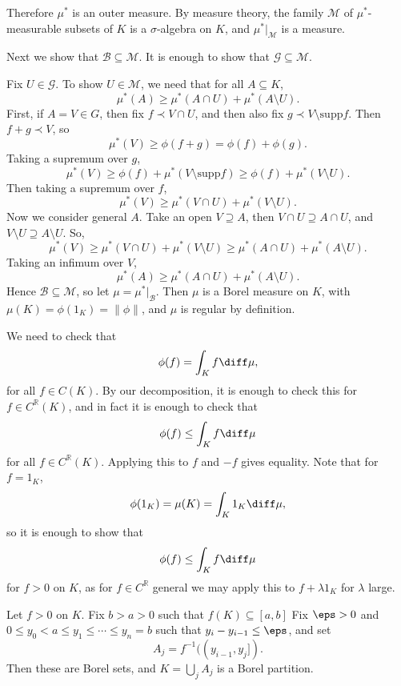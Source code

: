\documentclass[12pt]{article}
\begin{document}
\begin{proofbox}
	Therefore $\mu^{\ast}$ is an outer measure. By measure theory, the family $\mathcal{M}$ of $\mu^{\ast}$-measurable subsets of $K$ is a $\sigma$-algebra on $K$, and $\mu^{\ast}|_{\mathcal{M}}$ is a measure.

	Next we show that $\mathcal{B} \subseteq \mathcal{M}$. It is enough to show that $\mathcal{G} \subseteq \mathcal{M}$.

	Fix $U \in \mathcal{G}$. To show $U \in \mathcal{M}$, we need that for all $A \subseteq K$,
	\[
	\mu^{\ast}(A) \geq \mu^{\ast}(A \cap U) + \mu^{\ast}(A \setminus U).
	\]
	First, if $A = V \in G$, then fix $f \prec V \cap U$, and then also fix $g \prec V \setminus \mathrm{supp} f$. Then $f + g \prec V$, so
	\[
	\mu^{\ast}(V) \geq \phi(f + g) = \phi(f) + \phi(g).
	\]
	Taking a supremum over $g$,
	\[
	\mu^{\ast}(V) \geq \phi(f) + \mu^{\ast}(V \setminus \mathrm{supp} f) \geq \phi(f) + \mu^{\ast}(V \setminus U).
	\]
	Then taking a supremum over $f$,
	\[
		\mu^{\ast}(V) \geq \mu^{\ast}(V \cap U) + \mu^{\ast}(V \setminus U).
	\]
	Now we consider general $A$. Take an open $V \supseteq A$, then $V \cap U \supseteq A \cap U$, and $V \setminus U \supseteq A \setminus U$. So,
	\[
	\mu^{\ast}(V) \geq \mu^{\ast}(V \cap U) + \mu^{\ast}(V \setminus U) \geq \mu^{\ast}(A \cap U) + \mu^{\ast}(A \setminus U).
	\]
	Taking an infimum over $V$,
	\[
	\mu^{\ast}(A) \geq \mu^{\ast}(A \cap U) + \mu^{\ast}(A \setminus U).
	\]
	Hence $\mathcal{B} \subseteq \mathcal{M}$, so let $\mu = \mu^{\ast}|_{\mathcal{B}}$. Then $\mu$ is a Borel measure on $K$, with $\mu(K) = \phi(1_K) = \|\phi\|$, and $\mu$ is regular by definition.

	We need to check that
	\[
	\phi(f) = \int_K f \diff \mu,
	\]
	for all $f \in C(K)$. By our decomposition, it is enough to check this for $f \in C^{\mathbb{R}}(K)$, and in fact it is enough to check that
	\[
	\phi(f) \leq \int_K f \diff \mu
	\]
	for all $f \in C^{\mathbb{R}}(K)$. Applying this to $f$ and $-f$ gives equality. Note that for $f = 1_K$,
	\[
	\phi(1_K) = \mu(K) = \int_K 1_K \diff \mu,
	\]
	so it is enough to show that
	\[
	\phi(f) \leq \int_K f \diff \mu
	\]
	for $f > 0$ on $K$, as for $f \in C^{\mathbb{R}}$ general we may apply this to $f + \lambda 1_K$ for $\lambda$ large.

	Let $f > 0$ on $K$. Fix $b > a > 0$ such that $f(K) \subseteq [a, b]$ Fix $\eps > 0$ and $0 \leq y_0 < a \leq y_1 \leq \cdots \leq y_n = b$ such that $y_i - y_{i-1} \leq \eps$, and set
	\[
		A_j = f^{-1}((y_{i-1}, y_j]).
	\]
	Then these are Borel sets, and $K = \bigcup_j A_j$ is a Borel partition.


\end{proofbox}
\end{document}
